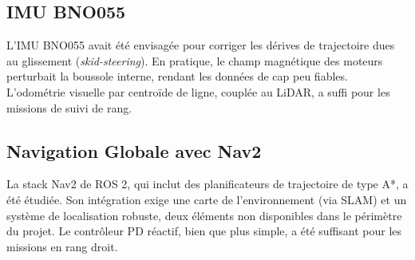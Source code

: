 \subsection{IMU BNO055}
L'IMU BNO055 avait été envisagée pour corriger les dérives de trajectoire dues au glissement (\textit{skid-steering}). En pratique, le champ magnétique des moteurs perturbait la boussole interne, rendant les données de cap peu fiables. L'odométrie visuelle par centroïde de ligne, couplée au LiDAR, a suffi pour les missions de suivi de rang.

\subsection{Navigation Globale avec Nav2}
La stack Nav2 de ROS 2, qui inclut des planificateurs de trajectoire de type A*, a été étudiée. Son intégration exige une carte de l'environnement (via SLAM) et un système de localisation robuste, deux éléments non disponibles dans le périmètre du projet. Le contrôleur PD réactif, bien que plus simple, a été suffisant pour les missions en rang droit.
